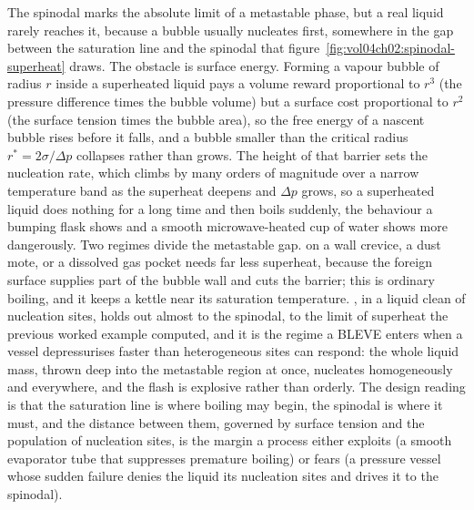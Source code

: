 \begin{mastery}
The spinodal marks the absolute limit of a metastable phase, but a real
liquid rarely reaches it, because a bubble usually nucleates first,
somewhere in the gap between the saturation line and the spinodal that
figure~\ref{fig:vol04ch02:spinodal-superheat} draws. The obstacle is
surface energy. Forming a vapour bubble of radius $r$ inside a superheated
liquid pays a volume reward proportional to $r^3$ (the pressure difference
times the bubble volume) but a surface cost proportional to $r^2$ (the
surface tension times the bubble area), so the free energy of a nascent
bubble rises before it falls, and a bubble smaller than the critical radius
$r^* = 2\sigma/\Delta p$ collapses rather than grows. The height of that
barrier sets the nucleation rate, which climbs by many orders of magnitude
over a narrow temperature band as the superheat deepens and $\Delta p$
grows, so a superheated liquid does nothing for a long time and then boils
suddenly, the behaviour a bumping flask shows and a smooth
microwave-heated cup of water shows more dangerously. Two regimes divide the
metastable gap.  on a wall crevice, a
dust mote, or a dissolved gas pocket needs far less superheat, because the
foreign surface supplies part of the bubble wall and cuts the barrier; this
is ordinary boiling, and it keeps a kettle near its saturation temperature.
, in a liquid clean of nucleation sites,
holds out almost to the spinodal, to the limit of superheat the previous
worked example computed, and it is the regime a BLEVE enters when a vessel
depressurises faster than heterogeneous sites can respond: the whole liquid
mass, thrown deep into the metastable region at once, nucleates
homogeneously and everywhere, and the flash is explosive rather than
orderly. The design reading is that the saturation line is where boiling may
begin, the spinodal is where it must, and the distance between them, governed
by surface tension and the population of nucleation sites, is the margin a
process either exploits (a smooth evaporator tube that suppresses premature
boiling) or fears (a pressure vessel whose sudden failure denies the liquid
its nucleation sites and drives it to the spinodal).
\end{mastery}

